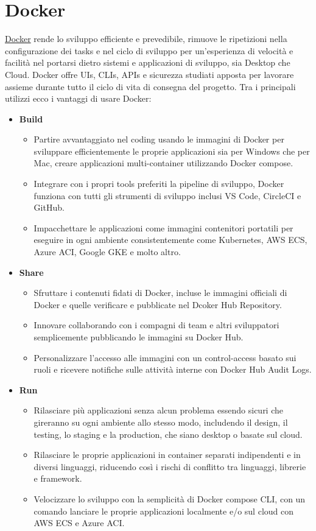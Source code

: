 \documentclass[a4paper,12pt]{report}
\newcommand{\docker}{\href{https://www.docker.com/}{Docker} }
\begin{document}
\section{Docker}
\docker rende lo sviluppo efficiente e prevedibile, rimuove le ripetizioni nella configurazione dei tasks e nel ciclo di sviluppo per un'esperienza di velocità e facilità nel portarsi dietro sistemi e applicazioni di sviluppo, sia Desktop che Cloud. Docker offre UIs, CLIs, APIs e sicurezza studiati apposta per lavorare assieme durante tutto il ciclo di vita di consegna del progetto. Tra i principali utilizzi ecco i vantaggi di usare Docker:
\begin{itemize}
    \item \textbf{Build}
    \begin{itemize}
        \item Partire avvantaggiato nel coding usando le immagini di Docker per sviluppare efficientemente le proprie applicazioni sia per Windows che per Mac, creare applicazioni multi-container utilizzando Docker compose.
        \item Integrare con i propri tools preferiti la pipeline di sviluppo, Docker funziona con tutti gli strumenti di sviluppo inclusi VS Code, CircleCI e GitHub.
        \item Impacchettare le applicazioni come immagini contenitori portatili per eseguire in ogni ambiente consistentemente come Kubernetes, AWS ECS, Azure ACI, Google GKE e molto altro.
    \end{itemize}
    \item \textbf{Share}
    \begin{itemize}
        \item Sfruttare i contenuti fidati di Docker, incluse le immagini officiali di Docker e quelle verificare e pubblicate nel Dcoker Hub Repository.
        \item Innovare collaborando con i compagni di team e altri sviluppatori semplicemente pubblicando le immagini su Docker Hub.
        \item Personalizzare l'accesso alle immagini con un control-access basato sui ruoli e ricevere notifiche sulle attività interne con Docker Hub Audit Logs.
    \end{itemize}
    \item \textbf{Run}
    \begin{itemize}
        \item Rilasciare più applicazioni senza alcun problema essendo sicuri che gireranno su ogni ambiente allo stesso modo, includendo il design, il testing, lo staging e la production, che siano desktop o basate sul cloud.
        \item Rilasciare le proprie applicazioni in container separati indipendenti e in diversi linguaggi, riducendo così i rischi di conflitto tra linguaggi, librerie e framework.
        \item Velocizzare lo sviluppo con la semplicità di Docker compose CLI, con un comando lanciare le proprie applicazioni localmente e/o sul cloud con AWS ECS e Azure ACI.
    \end{itemize}
\end{itemize}
\end{document}
